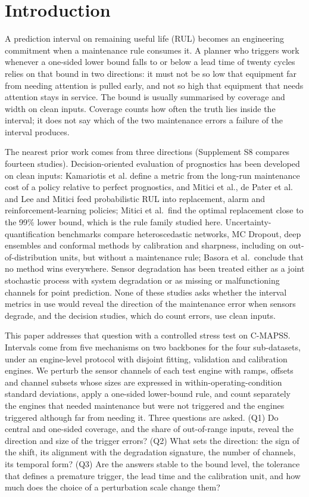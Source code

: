\documentclass[11pt,a4paper]{article}
\begin{document}
\section{Introduction}
A prediction interval on remaining useful life (RUL) becomes an engineering commitment when a maintenance rule consumes it. A planner who triggers work whenever a one-sided lower bound falls to or below a lead time of twenty cycles relies on that bound in two directions: it must not be so low that equipment far from needing attention is pulled early, and not so high that equipment that needs attention stays in service. The bound is usually summarised by coverage and width on clean inputs. Coverage counts how often the truth lies inside the interval; it does not say which of the two maintenance errors a failure of the interval produces.

The nearest prior work comes from three directions (Supplement S8 compares fourteen studies). Decision-oriented evaluation of prognostics has been developed on clean inputs: Kamariotis et al.\cite{kamariotis2024} define a metric from the long-run maintenance cost of a policy relative to perfect prognostics, and Mitici et al.\cite{mitici2023}, de Pater et al.\cite{depater2022} and Lee and Mitici\cite{lee2022} feed probabilistic RUL into replacement, alarm and reinforcement-learning policies; Mitici et al.\ find the optimal replacement close to the 99\% lower bound, which is the rule family studied here. Uncertainty-quantification benchmarks compare heteroscedastic networks, MC Dropout, deep ensembles and conformal methods by calibration and sharpness, including on out-of-distribution units,\cite{basora2025,piao2025,xu2026,javanmardi2022} but without a maintenance rule; Basora et al.\ conclude that no method wins everywhere. Sensor degradation has been treated either as a joint stochastic process with system degradation\cite{hachem2024} or as missing or malfunctioning channels for point prediction.\cite{xu2023,tang2026} None of these studies asks whether the interval metrics in use would reveal the direction of the maintenance error when sensors degrade, and the decision studies, which do count errors, use clean inputs.

This paper addresses that question with a controlled stress test on C-MAPSS. Intervals come from five mechanisms on two backbones for the four sub-datasets, under an engine-level protocol with disjoint fitting, validation and calibration engines. We perturb the sensor channels of each test engine with ramps, offsets and channel subsets whose sizes are expressed in within-operating-condition standard deviations, apply a one-sided lower-bound rule, and count separately the engines that needed maintenance but were not triggered and the engines triggered although far from needing it. Three questions are asked. (Q1) Do central and one-sided coverage, and the share of out-of-range inputs, reveal the direction and size of the trigger errors? (Q2) What sets the direction: the sign of the shift, its alignment with the degradation signature, the number of channels, its temporal form? (Q3) Are the answers stable to the bound level, the tolerance that defines a premature trigger, the lead time and the calibration unit, and how much does the choice of a perturbation scale change them?
\end{document}
